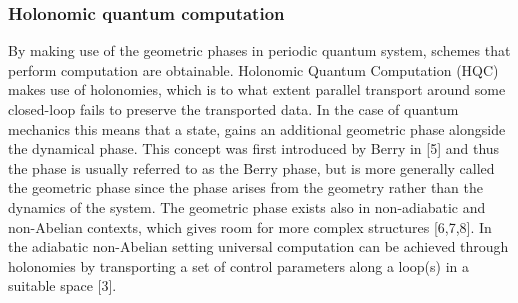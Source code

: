 \subsubsection{Holonomic quantum computation}
By making use of the geometric phases in periodic quantum system, schemes that perform computation are obtainable. Holonomic Quantum Computation (HQC) makes use of holonomies, which is to what extent parallel transport around some closed-loop fails to preserve the transported data. In the case of quantum mechanics this means that a state, gains an additional geometric phase alongside the dynamical phase. This concept was first introduced by Berry in [5] and thus the phase is usually referred to as the Berry phase, but is more generally called the geometric phase since the phase arises from the geometry rather than the dynamics of the system. The geometric phase exists also in non-adiabatic and non-Abelian contexts, which gives room for more complex structures [6,7,8]. In the adiabatic non-Abelian setting universal computation can be achieved through holonomies by transporting a set of control parameters along a loop(s) in a suitable space [3]. 

